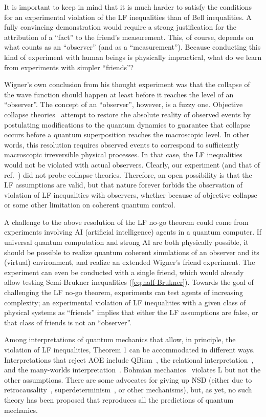 \documentclass[aps,prx,twocolumn,superscriptaddress]{revtex4-1}
\theoremstyle{plain}
\begin{document}
It is important to 
keep in mind that it is much harder to satisfy the conditions for an experimental violation of the LF inequalities than of Bell inequalities. A fully convincing demonstration would require a strong justification for the attribution of a ``fact'' to the friend's measurement. This, of course, depends on what counts as an ``observer'' (and as a ``measurement''). Because conducting this kind of experiment with human beings is physically impractical, what do we learn from experiments with simpler ``friends''?

Wigner's own conclusion from his thought experiment was that the collapse of the wave function should happen at least before it reaches the level of an ``observer''. The concept of an ``observer'', however, is a fuzzy one. Objective collapse theories~\cite{Bassi2003} attempt to restore the absolute reality of observed events by postulating modifications to the quantum dynamics to guarantee that collapse occurs before a quantum superposition reaches the macroscopic level. In other words, this resolution requires observed events to correspond to sufficiently macroscopic irreversible physical processes. In that case, the LF inequalities would not be violated with actual observers. Clearly, our experiment (and that of ref.~\cite{Proietti2019}) did not probe collapse theories.  Therefore, an open possibility is that the LF assumptions are valid, but that nature forever forbids the observation of violation of LF inequalities with observers, whether because of objective collapse or some other limitation on coherent quantum control.

A challenge to the above resolution of the LF no-go theorem could come from experiments involving AI (artificial intelligence) agents in a quantum computer. If universal quantum computation and strong AI are both physically possible, it should be possible to realize quantum coherent simulations of an observer and its (virtual) environment, and realize an extended Wigner's friend experiment. The experiment can even be conducted with a single friend, which would already allow testing Semi-Brukner inequalities (\ref{eq:half-Brukner}).
Towards the goal of challenging the LF no-go theorem, experiments can test agents of increasing complexity; an experimental violation of LF inequalities with a given class of physical systems as ``friends'' implies that either the LF assumptions are false, or that class of friends is not an ``observer''.

Among interpretations of quantum mechanics that allow, in principle, the violation of LF inequalities, Theorem 1 can be accommodated in different ways. Interpretations that reject AOE include QBism~\cite{Fuchs2013, Mermin2014}, the relational interpretation~\cite{Rovelli1996}, and the many-worlds interpretation~\cite{Everett1957}. Bohmian mechanics~\cite{Bohm1, Bohm2} violates L but not the other assumptions. There are some advocates for
giving up NSD (either due to retrocausality~\cite{Price2008}, superdeterminism~\cite{tHooft2007}, or other mechanisms), but, as yet, no such theory has been proposed that reproduces all the predictions of quantum mechanics.
\end{document}
